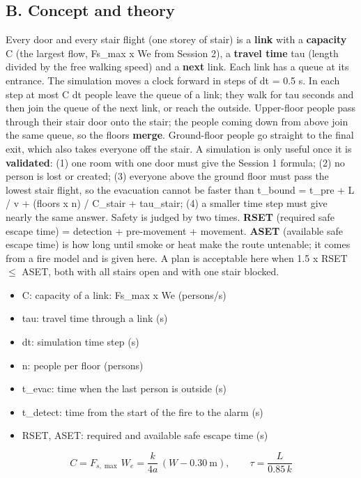 \documentclass[11pt,a4paper]{article}
\begin{document}
\subsection*{B. Concept and theory}
Every door and every stair flight (one storey of stair) is a \textbf{link} with a \textbf{capacity} C (the largest flow, Fs\_max x We from Session 2), a \textbf{travel time} tau (length divided by the free walking speed) and a \textbf{next} link. Each link has a queue at its entrance. The simulation moves a clock forward in steps of dt = 0.5 s. In each step at most C dt people leave the queue of a link; they walk for tau seconds and then join the queue of the next link, or reach the outside. Upper-floor people pass through their stair door onto the stair; the people coming down from above join the same queue, so the floors \textbf{merge}. Ground-floor people go straight to the final exit, which also takes everyone off the stair. A simulation is only useful once it is \textbf{validated}: (1) one room with one door must give the Session 1 formula; (2) no person is lost or created; (3) everyone above the ground floor must pass the lowest stair flight, so the evacuation cannot be faster than t\_bound = t\_pre + L / v + (floors x n) / C\_stair + tau\_stair; (4) a smaller time step must give nearly the same answer. Safety is judged by two times. \textbf{RSET} (required safe escape time) = detection + pre-movement + movement. \textbf{ASET} (available safe escape time) is how long until smoke or heat make the route untenable; it comes from a fire model and is given here. A plan is acceptable here when 1.5 x RSET $\le$ ASET, both with all stairs open and with one stair blocked.

\begin{itemize}[nosep]
\item C: capacity of a link: Fs\_max x We (persons/s)
\item tau: travel time through a link (s)
\item dt: simulation time step (s)
\item n: people per floor (persons)
\item t\_evac: time when the last person is outside (s)
\item t\_detect: time from the start of the fire to the alarm (s)
\item RSET, ASET: required and available safe escape time (s)
\end{itemize}

\begin{equation*}
C = F_{s,\max}\,W_e = \frac{k}{4a}\,(W - 0.30\ \mathrm{m}),\qquad \tau = \frac{L}{0.85\,k}
\end{equation*}
\end{document}
